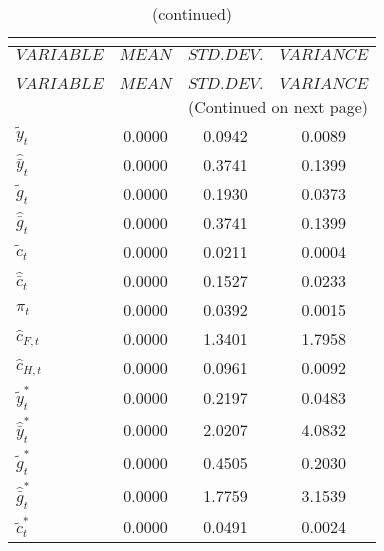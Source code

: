  
\begin{center}
\begin{longtable}{lccc} 
\caption{THEORETICAL MOMENTS}\\
 \label{Table:th_moments}\\
\toprule 
$VARIABLE             $	 & 	 $         MEAN$	 & 	 $    STD. DEV.$	 & 	 $     VARIANCE$\\
\midrule \endfirsthead 
\caption{(continued)}\\
 \toprule \\ 
$VARIABLE             $	 & 	 $         MEAN$	 & 	 $    STD. DEV.$	 & 	 $     VARIANCE$\\
\midrule \endhead 
\midrule \multicolumn{4}{r}{(Continued on next page)} \\ \bottomrule \endfoot 
\bottomrule \endlastfoot 
${\tilde y_t}         $	 & 	       0.0000	 & 	       0.0942	 & 	       0.0089 \\ 
${\hat {\bar y}_t}    $	 & 	       0.0000	 & 	       0.3741	 & 	       0.1399 \\ 
${\tilde g_t}         $	 & 	       0.0000	 & 	       0.1930	 & 	       0.0373 \\ 
${\hat {\bar g}_t}    $	 & 	       0.0000	 & 	       0.3741	 & 	       0.1399 \\ 
${\tilde c_t}         $	 & 	       0.0000	 & 	       0.0211	 & 	       0.0004 \\ 
${\hat {\bar c}_t}    $	 & 	       0.0000	 & 	       0.1527	 & 	       0.0233 \\ 
${\pi_t}              $	 & 	       0.0000	 & 	       0.0392	 & 	       0.0015 \\ 
${\hat c_{F,t}}       $	 & 	       0.0000	 & 	       1.3401	 & 	       1.7958 \\ 
${\hat c_{H,t}}       $	 & 	       0.0000	 & 	       0.0961	 & 	       0.0092 \\ 
${\tilde y_t^*}       $	 & 	       0.0000	 & 	       0.2197	 & 	       0.0483 \\ 
${\hat {\bar y}_t^*}  $	 & 	       0.0000	 & 	       2.0207	 & 	       4.0832 \\ 
${\tilde g_t^*}       $	 & 	       0.0000	 & 	       0.4505	 & 	       0.2030 \\ 
${\hat {\bar g}_t^*}  $	 & 	       0.0000	 & 	       1.7759	 & 	       3.1539 \\ 
${\tilde c_t^*}       $	 & 	       0.0000	 & 	       0.0491	 & 	       0.0024 \\ 

\end{longtable}
\end{center}

